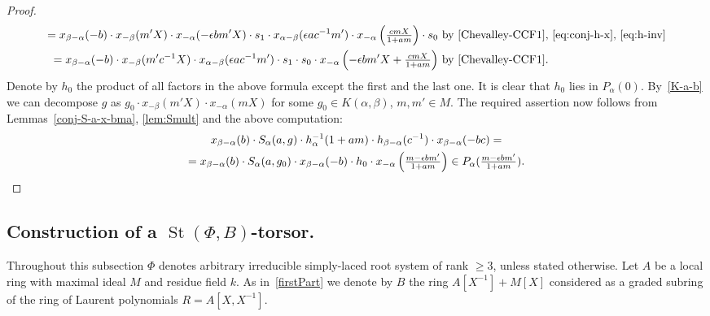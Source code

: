 \documentclass[oneside, 8pt]{amsart}
\theoremstyle{remark}
\theoremstyle{definition}
\numberwithin{lemma}{section}
\numberwithin{prop}{section}
\numberwithin{corollary}{section}
\numberwithin{externaltheorem}{section}
\DeclareMathOperator{\St}{St}
\newcommand{\inv}{^{-1}}
\numberwithin{equation}{section}
\begin{document}
\begin{proof}
\begin{align*}
 =  x_{\beta - \alpha}(-b) \cdot x_{-\beta}(m'X) \cdot x_{-\alpha}(-\epsilon bm'X) \cdot s_1 \cdot x_{\alpha-\beta}(\epsilon ac^{-1}m') \cdot x_{-\alpha}\left(\tfrac{cmX}{1+am}\right) \cdot s_0 &\text{ by~\eqref{Chevalley-CCF1},~\eqref{eq:conj-h-x},~\eqref{eq:h-inv}}\\
 = x_{\beta-\alpha}(-b) \cdot x_{-\beta}(m'c^{-1}X) \cdot x_{\alpha-\beta}(\epsilon ac^{-1}m') \cdot s_1 \cdot s_0 \cdot x_{-\alpha}\left(-\epsilon bm' X + \tfrac{cmX}{1+am}\right) &\text{ by~\eqref{Chevalley-CCF1}.}
\end{align*}
Denote by $h_0$ the product of all factors in the above formula except the first and the last one. It is clear that $h_0$ lies in $P_\alpha(0)$. By~\cref{K-a-b} we can decompose $g$ as $g_0 \cdot x_{-\beta}(m'X) \cdot x_{-\alpha}(mX)$ for some $g_0 \in K(\alpha, \beta)$, $m, m' \in M$. The required assertion now follows from Lemmas~\ref{conj-S-a-x-bma}, \ref{lem:Smult} and the above computation:
\begin{multline} \nonumber
 x_{\beta - \alpha}(b) \cdot S_\alpha(a, g) \cdot h_{\alpha}^{-1}(1+am)\cdot h_{\beta - \alpha}(c^{-1})\cdot x_{\beta - \alpha}(-bc) = \\
  = x_{\beta - \alpha}(b) \cdot S_\alpha(a, g_0) \cdot x_{\beta-\alpha}(-b) \cdot h_0 \cdot x_{-\alpha}\left(\tfrac{m -\epsilon bm'}{1+am}\right) \in P_\alpha(\tfrac{m -\epsilon bm'}{1+am}). \qedhere
\end{multline}
\end{proof}

\subsection{Construction of a \texorpdfstring{$\St(\Phi, B)$}{St(B)}-torsor.} \label{sec:V-construction}
Throughout this subsection $\Phi$ denotes arbitrary irreducible simply-laced root system of rank $\geq 3$, unless stated otherwise. Let $A$ be a local ring with maximal ideal $M$ and residue field $k$. As in~\cref{firstPart} we denote by $B$ the ring $A[X\inv] + M[X]$ considered as a graded subring of the ring of Laurent polynomials $R = A[X, X\inv]$.
\end{document}
